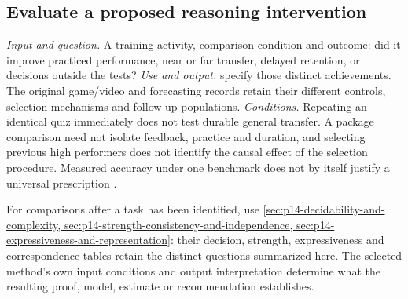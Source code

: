 \subsection{Evaluate a proposed reasoning intervention}
\label{sec:p14-finder-reasoning-intervention}
\textit{Input and question.} A training activity, comparison condition
and outcome: did it improve practiced performance, near or far transfer,
delayed retention, or decisions outside the tests?
\textit{Use and output.}  specify those distinct achievements.
The original game/video and forecasting records retain their different
controls, selection mechanisms and follow-up populations.
\textit{Conditions.} Repeating an identical quiz immediately does not
test durable general transfer. A package comparison need not isolate
feedback, practice and duration, and selecting previous high performers
does not identify the causal effect of the selection procedure.
Measured accuracy under one benchmark does not by itself justify a
universal prescription \cite{DeOliveiraNisbett2021Improve,
MorewedgeEtAl2015Debiasing,MellersEtAl2014ForecastTraining}.

For comparisons after a task has been identified, use
\cref{sec:p14-decidability-and-complexity,
sec:p14-strength-consistency-and-independence,
sec:p14-expressiveness-and-representation}: their decision, strength,
expressiveness and correspondence tables retain the distinct questions
summarized here. The
selected method's own input conditions and output interpretation determine
what the resulting proof, model, estimate or recommendation establishes.

